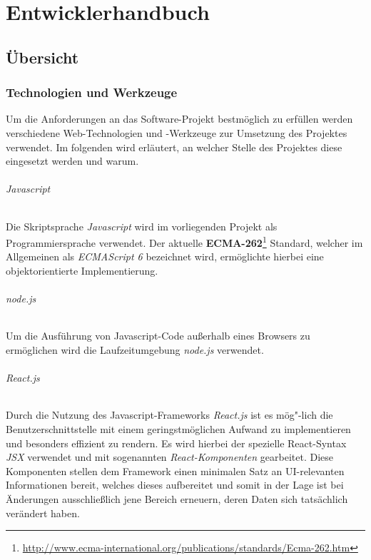 \part{Entwicklerhandbuch}

\chapter{Übersicht}
\section{Technologien und Werkzeuge}
Um die Anforderungen an das Software-Projekt bestmöglich zu erfüllen werden verschiedene Web-Technologien und -Werkzeuge zur Umsetzung des Projektes verwendet. Im folgenden wird erläutert, an welcher Stelle des Projektes diese eingesetzt werden und warum.

\paragraph{Javascript}
Die Skriptsprache \textit{Javascript} wird im vorliegenden Projekt als Programmiersprache verwendet.
Der aktuelle \textbf{ECMA-262}\footnote{\url{http://www.ecma-international.org/publications/standards/Ecma-262.htm}} Standard, welcher im Allgemeinen als \textit{ECMAScript 6} bezeichnet wird, ermöglichte hierbei eine objektorientierte Implementierung.

\paragraph{node.js}
Um die Ausführung von Javascript-Code außerhalb eines Browsers zu ermöglichen wird die Laufzeitumgebung \textit{node.js} verwendet.

\paragraph{React.js}
Durch die Nutzung des Javascript-Frameworks \textit{React.js} ist es mög"-lich die Benutzerschnittstelle mit einem geringstmöglichen Aufwand zu implementieren und besonders effizient zu rendern.
Es wird hierbei der spezielle React-Syntax \textit{JSX} verwendet und mit sogenannten \textit{React-Komponenten} gearbeitet.
Diese Komponenten stellen dem Framework einen minimalen Satz an UI-relevanten Informationen bereit, welches dieses aufbereitet und somit in der Lage ist bei Änderungen ausschließlich jene Bereich erneuern, deren Daten sich tatsächlich verändert haben.

